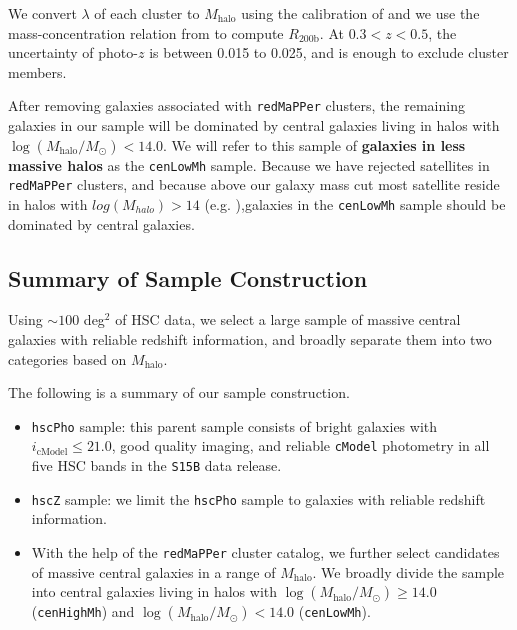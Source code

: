 \documentclass[a4paper,fleqn,usenatbib]{mnras}
\def\redm{\texttt{redMaPPer}}
\def\rbcg{\texttt{cenHighMh}}
\def\nbcg{\texttt{cenLowMh}}
\def\mhalo{{$M_{\mathrm{halo}}$}}
\def\logmh{{$\log (M_{\mathrm{halo}}/M_{\odot})$}}
\begin{document}
    We convert $\lambda$ of each cluster to $M_{\mathrm{halo}}$ using the calibration 
    of \citet{Simet2016} and we use the mass-concentration relation from 
    \citet{Diemer2015} to compute $R_{\mathrm{200b}}$. 
    At $0.3 < z < 0.5$, the uncertainty of photo-$z$ is between 0.015 to 0.025, and 
    is enough to exclude cluster members.
    
    After removing galaxies associated with \redm{} clusters, the remaining galaxies 
    in our sample will be dominated by central galaxies living in halos with 
    \logmh{}$< 14.0$. 
    We will refer to this sample of \textbf{galaxies in less 
    massive halos} as the \nbcg{} sample. Because we have rejected satellites in \redm{} clusters, and because above our galaxy mass cut most satellite reside in halos with $log(M_{halo})>14$ (e.g. \citealt{Reid2014, 
    Hoshino2015, Saito2016, vanUitert2016}),galaxies in the \nbcg{} sample should  be dominated by central galaxies.
    

\subsection{Summary of Sample Construction}
    \label{ssec:sample}

    Using ${\sim} 100$ deg$^2$ of HSC data, we select a large sample of massive central 
    galaxies with reliable redshift information, and broadly separate them into two 
    categories based on $M_{\mathrm{halo}}$.
    
    The following is a summary of our sample construction.
    
    \begin{itemize}
        \item \texttt{hscPho} sample: this parent sample consists of bright galaxies 
            with $i_{\mathrm{cModel}} \leq 21.0$, good quality imaging, and reliable 
            \texttt{cModel} photometry in all five HSC bands in the \texttt{S15B} 
            data release. 
        \item \texttt{hscZ} sample: we limit the \texttt{hscPho} sample to galaxies 
            with reliable redshift information. 
        \item With the help of the \redm{} cluster catalog, we further select 
            candidates of massive central galaxies in a range of \mhalo{}.
            We broadly divide the sample into central galaxies living in halos
            with \logmh{}$\geq 14.0$ (\rbcg{}) and \logmh{}$<14.0$ (\nbcg{}). 
    \end{itemize}
    
\end{document}
